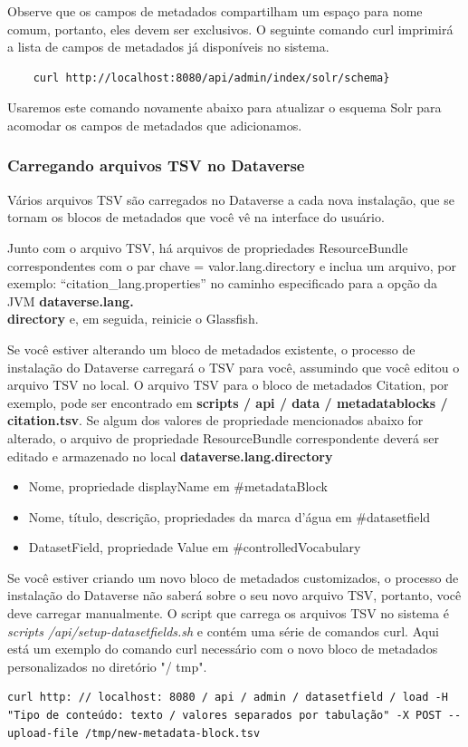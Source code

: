 \documentclass[12pt,hidelinks]{article}
\begin{document}
\qquad Observe que os campos de metadados compartilham um espaço para nome comum, portanto, eles devem ser exclusivos. O seguinte comando curl imprimirá a lista de campos de metadados já disponíveis no sistema.
    \begin{verbatim}
    curl http://localhost:8080/api/admin/index/solr/schema}
    \end{verbatim}
Usaremos este comando novamente abaixo para atualizar o esquema Solr para acomodar os campos de metadados que adicionamos.

\subsubsection{Carregando arquivos TSV no Dataverse}

\qquad Vários arquivos TSV são carregados no Dataverse a cada nova instalação, que se tornam os blocos de metadados que você vê na interface do usuário.

Junto com o arquivo TSV, há arquivos de propriedades ResourceBundle correspondentes com o par chave = valor.lang.directory e inclua um arquivo, por exemplo: “citation\_lang.properties” no caminho especificado para a opção da JVM 
\textbf{dataverse.lang.\\directory} e, em seguida, reinicie o Glassfish.

Se você estiver alterando um bloco de metadados existente, o processo de instalação do Dataverse carregará o TSV para você, assumindo que você editou o arquivo TSV no local. O arquivo TSV para o bloco de metadados Citation, por exemplo, pode ser encontrado em  \textbf{scripts / api / data / metadatablocks / citation.tsv}. Se algum dos valores de propriedade mencionados abaixo for alterado, o arquivo de propriedade ResourceBundle correspondente deverá ser editado e armazenado no local \textbf{dataverse.lang.directory}

\begin{itemize}
    
\item Nome, propriedade displayName em \#metadataBlock
\item Nome, título, descrição, propriedades da marca d'água em \#datasetfield
\item DatasetField, propriedade Value em \#controlledVocabulary

\end{itemize}

Se você estiver criando um novo bloco de metadados customizados, o processo de instalação do Dataverse não saberá sobre o seu novo arquivo TSV, portanto, você deve carregar manualmente. O script que carrega os arquivos TSV no sistema é \textit{scripts /api/setup-datasetfields.sh} e contém uma série de comandos curl. Aqui está um exemplo do comando curl necessário com o novo bloco de metadados personalizados no diretório "/ tmp".
\begin{verbatim}
curl http: // localhost: 8080 / api / admin / datasetfield / load -H "Tipo de conteúdo: texto / valores separados por tabulação" -X POST --upload-file /tmp/new-metadata-block.tsv
\end{verbatim}
\end{document}
